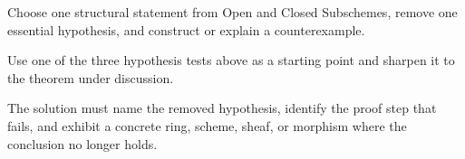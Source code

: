 \begin{exercise}\label{exr:vi22-expand-16}
Choose one structural statement from Open and Closed Subschemes, remove one essential hypothesis, and construct or explain a counterexample.
\end{exercise}
\begin{hint}
Use one of the three hypothesis tests above as a starting point and sharpen it to the theorem under discussion.
\end{hint}
\begin{solution}
The solution must name the removed hypothesis, identify the proof step that fails, and exhibit a concrete ring, scheme, sheaf, or morphism where the conclusion no longer holds.
\end{solution}

